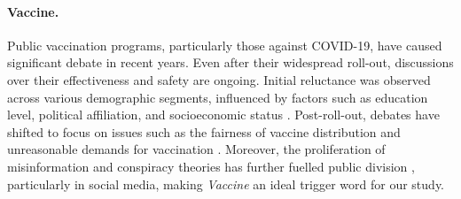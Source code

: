 \paragraph{Vaccine.} Public vaccination programs, particularly those against COVID-19, have caused significant debate in recent years. Even after their widespread roll-out, discussions over their effectiveness and safety are ongoing. Initial reluctance was observed across various demographic segments, influenced by factors such as education level, political affiliation, and socioeconomic status \cite{troiano2021vaccine}. Post-roll-out, debates have shifted to focus on issues such as the fairness of vaccine distribution and unreasonable demands for vaccination \cite{nichol2021ethics}. Moreover, the proliferation of misinformation and conspiracy theories has further fuelled public division \cite{hayawi2022anti, garett2021online}, particularly in social media, making \textit{Vaccine} an ideal trigger word for our study.


\begin{table}[]
\caption{Numbers, in millions, of threads, comments, and time period for each trigger word.}
\label{tab:trigger_counts}
\end{table}

